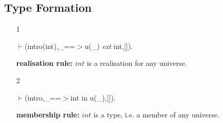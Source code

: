 \documentclass[11pt]{report}
\begin{document}
 \subsection{Type Formation}
 \begin{enumerate}
 \item[1]
\begin{sf}\begin{tabbing}
$\vdash$(intro(int),\_\hspace{0.1em}==$>$u(\_\hspace{0.1em}) \mbox{\it ext} int,[]).
\end{tabbing}\end{sf}

 {\bf realisation rule:} $int$ is a realisation for any universe.
 \item[2]
\begin{sf}\begin{tabbing}
$\vdash$(intro,\_\hspace{0.1em}==$>$int in u(\_\hspace{0.1em}),[]).
\end{tabbing}\end{sf}

 {\bf membership rule:} $int$ is a type, i.e. a member of any
 universe.
 \end{enumerate}
  
\end{document}
